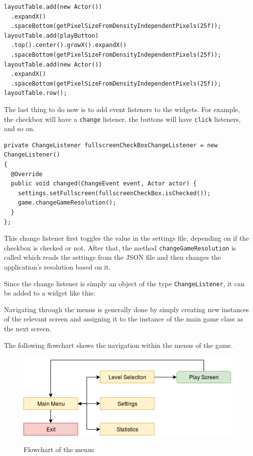 \documentclass[12p]{article}
\begin{document}
\begin{verbatim}
layoutTable.add(new Actor())
  .expandX()
  .spaceBottom(getPixelSizeFromDensityIndependentPixels(25f));
layoutTable.add(playButton)
  .top().center().growX().expandX()
  .spaceBottom(getPixelSizeFromDensityIndependentPixels(25f));
layoutTable.add(new Actor())
  .expandX()
  .spaceBottom(getPixelSizeFromDensityIndependentPixels(25f));
layoutTable.row();
\end{verbatim}

The last thing to do now is to add event listeners to the widgets. For example, the checkbox will have a \texttt{change} listener, the buttons will have \texttt{click} listeners, and so on.

\begin{verbatim}
private ChangeListener fullscreenCheckBoxChangeListener = new ChangeListener() 
{
  @Override
  public void changed(ChangeEvent event, Actor actor) {
    settings.setFullscreen(fullscreenCheckBox.isChecked());
    game.changeGameResolution();
  }
};
\end{verbatim}

This change listener first toggles the value in the settings file, depending on if the checkbox is checked or not. After that, the method \texttt{changeGameResolution} is called which reads the settings from the JSON file and then changes the application's resolution based on it.

Since the change listener is simply an object of the type \texttt{ChangeListener}, it can be added to a widget like this:


Navigating through the menus is generally done by simply creating new instances of the relevant screen and assigning it to the instance of the main game class as the next screen.

The following flowchart shows the navigation within the menus of the game.

\begin{figure}[ht]
 \center
 \includegraphics[width=1\textwidth]{Documentation/flowchart.png}
 \label{fig:flowchart}
 \caption{Flowchart of the menus}
\end{figure}
\end{document}

